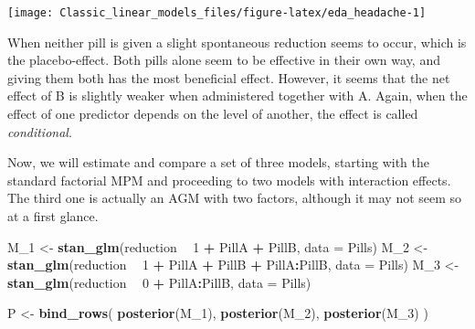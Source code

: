 \documentclass[]{svmono}
\newenvironment{Shaded}{\begin{snugshade}}{\end{snugshade}}
\newcommand{\KeywordTok}[1]{\textcolor[rgb]{0.13,0.29,0.53}{\textbf{#1}}}
\newcommand{\DataTypeTok}[1]{\textcolor[rgb]{0.13,0.29,0.53}{#1}}
\newcommand{\DecValTok}[1]{\textcolor[rgb]{0.00,0.00,0.81}{#1}}
\newcommand{\StringTok}[1]{\textcolor[rgb]{0.31,0.60,0.02}{#1}}
\newcommand{\OperatorTok}[1]{\textcolor[rgb]{0.81,0.36,0.00}{\textbf{#1}}}
\newcommand{\NormalTok}[1]{#1}
\begin{document}
\begin{Shaded}
\end{Shaded}

\texttt{[image: Classic\_linear\_models\_files/figure-latex/eda\_headache-1]}

When neither pill is given a slight spontaneous reduction seems to
occur, which is the placebo-effect. Both pills alone seem to be
effective in their own way, and giving them both has the most beneficial
effect. However, it seems that the net effect of B is slightly weaker
when administered together with A. Again, when the effect of one
predictor depends on the level of another, the effect is called
\emph{conditional}.

Now, we will estimate and compare a set of three models, starting with
the standard factorial MPM and proceeding to two models with interaction
effects. The third one is actually an AGM with two factors, although it
may not seem so at a first glance.

\begin{Shaded}
\begin{Highlighting}[]
\NormalTok{M_}\DecValTok{1}\NormalTok{ <-}\StringTok{ }\KeywordTok{stan_glm}\NormalTok{(reduction }\OperatorTok{~}\StringTok{ }\DecValTok{1} \OperatorTok{+}\StringTok{ }\NormalTok{PillA }\OperatorTok{+}\StringTok{ }\NormalTok{PillB, }\DataTypeTok{data =}\NormalTok{ Pills)}
\NormalTok{M_}\DecValTok{2}\NormalTok{ <-}\StringTok{ }\KeywordTok{stan_glm}\NormalTok{(reduction }\OperatorTok{~}\StringTok{ }\DecValTok{1} \OperatorTok{+}\StringTok{ }\NormalTok{PillA }\OperatorTok{+}\StringTok{ }\NormalTok{PillB }\OperatorTok{+}\StringTok{ }\NormalTok{PillA}\OperatorTok{:}\NormalTok{PillB, }\DataTypeTok{data =}\NormalTok{ Pills)}
\NormalTok{M_}\DecValTok{3}\NormalTok{ <-}\StringTok{ }\KeywordTok{stan_glm}\NormalTok{(reduction }\OperatorTok{~}\StringTok{ }\DecValTok{0} \OperatorTok{+}\StringTok{ }\NormalTok{PillA}\OperatorTok{:}\NormalTok{PillB, }\DataTypeTok{data =}\NormalTok{ Pills)}

\NormalTok{P <-}\StringTok{ }\KeywordTok{bind_rows}\NormalTok{(}
  \KeywordTok{posterior}\NormalTok{(M_}\DecValTok{1}\NormalTok{),}
  \KeywordTok{posterior}\NormalTok{(M_}\DecValTok{2}\NormalTok{),}
  \KeywordTok{posterior}\NormalTok{(M_}\DecValTok{3}\NormalTok{)}
\NormalTok{)}
\end{Highlighting}
\end{Shaded}
\end{document}
